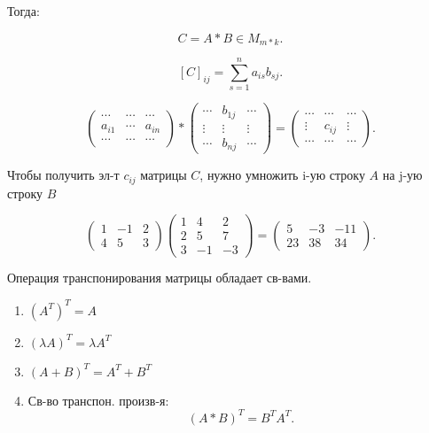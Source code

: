 Тогда:

\[
    C = A * B \in M_{m * k}
.\] 

\[
    [C]_{ij} = \sum_{s = 1}^{n} a_{is} b_{sj}
.\] 

\[
    \begin{pmatrix} \cdots & \cdots  & \cdots \\
a_{i1} & \cdots & a_{in} \\
\cdots & \cdots & \cdots \end{pmatrix} * 
    \begin{pmatrix} \cdots & b_{1j} & \cdots \\
        \vdots & \vdots & \vdots \\
        \cdots & b_{nj} & \cdots 
\end{pmatrix} = 
        \begin{pmatrix} \cdots & \cdots & \cdots \\
          \vdots & c_{ij} & \vdots \\
          \cdots & \cdots & \cdots \end{pmatrix}
.\] 

Чтобы получить эл-т $c_{ij}$ матрицы $C$, нужно умножить i-ую строку $A$ на j-ую строку $B$

\begin{example}
\[
    \begin{pmatrix} 1 & -1 & 2 \\ 4 & 5 & 3 \end{pmatrix} \begin{pmatrix} 1 & 4 & 2 \\ 2 & 5 & 7 \\ 3 & -1 & -3 \end{pmatrix} = \begin{pmatrix}  5 & -3 & -11 \\ 23 & 38 & 34  \end{pmatrix}
.\] 
\end{example}

\begin{statement}
Операция транспонирования матрицы обладает св-вами.
\begin{enumerate}
    \item $(A^{T})^{T} = A$
    \item $(\lambda A) ^{T} = \lambda A^{T}$
    \item $(A + B)^{T} = A^{T} + B^{T}$
    \item Св-во транспон. произв-я:
        \[
            (A * B)^{T} = B^{T}A^{T}
        .\] 
\end{enumerate}
\end{statement}

